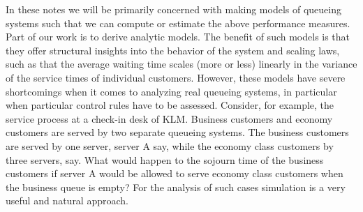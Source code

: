 In these notes we will be primarily concerned with making models of
queueing systems such that we can compute or estimate the above
performance measures.  Part of our work is to derive analytic
models. The benefit of such models is that they offer structural
insights into the behavior of the system and scaling laws, such as
that the average waiting time scales (more or less) linearly in the
variance of the service times of individual customers. However, these
models have severe shortcomings when it comes to analyzing real
queueing systems, in particular when particular control rules have to
be assessed.  Consider, for example, the service process at a check-in
desk of KLM. Business customers and economy customers are served by
two separate queueing systems. The business customers are served by
one server, server A say, while the economy class customers by three
servers, say. What would happen to the sojourn time of the business
customers if server A would be allowed to serve economy class
customers when the business queue is empty? For the analysis of such
cases simulation is a very useful and natural approach.

